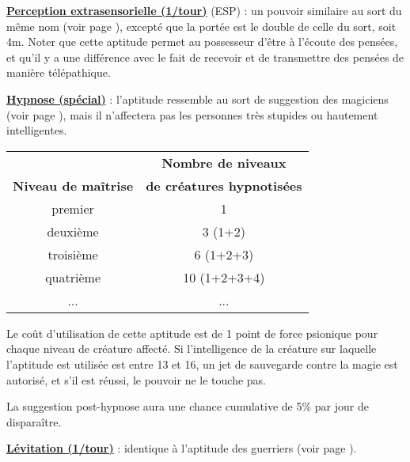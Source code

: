 \bigskip

\label{magicien-ESP}\textbf{\uline{Perception extrasensorielle (1/tour)}} (ESP) : un pouvoir similaire au sort du même nom (voir page \pageref{sort-esp}), excepté que la portée est le double de celle du sort, soit 4m. Noter que cette aptitude permet au possesseur d'être \og à l'écoute \fg{} des pensées, et qu'il y a une différence avec le fait de recevoir et de transmettre des pensées de manière télépathique.

\bigskip

\label{magicien-hypnose}\textbf{\uline{Hypnose (spécial)}} : l'aptitude ressemble au sort de suggestion des magiciens (voir page \pageref{sort-suggestion}), mais il n'affectera pas les personnes très stupides ou hautement intelligentes.

\bigskip

\begin{tabular}{cc}
                            &\textbf{Nombre de niveaux} \\
\textbf{Niveau de maîtrise} & \textbf{de créatures hypnotisées}\\
premier     & 1   \\
deuxième    & 3 (1+2)   \\
troisième   & 6 (1+2+3)  \\
quatrième   & 10 (1+2+3+4) \\
...         & ...    \\
\end{tabular}

\bigskip

Le coût d'utilisation de cette aptitude est de 1 point de force psionique pour chaque niveau de créature affecté. Si l'intelligence de la créature sur laquelle l'aptitude est utilisée est entre 13 et 16, un jet de sauvegarde contre la magie est autorisé, et s'il est réussi, le pouvoir ne le touche pas.

\bigskip

La suggestion post-hypnose aura une chance cumulative de 5\% par jour de disparaître.

\bigskip

\textbf{\uline{Lévitation (1/tour)}} : identique à l'aptitude des guerriers (voir page \pageref{guerrier-levitation}).

